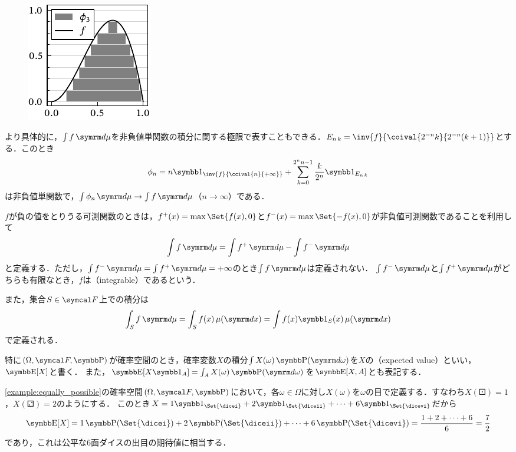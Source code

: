 \documentclass[../../main]{subfiles}
\begin{document}
\begin{figure}
  \includegraphics{figures/integration.pdf}
\end{figure}

より具体的に，\(\int f\measured{\mu}\)を非負値単関数の積分に関する極限で表すこともできる．\(\midx{E}{n}{k}=\inv{f}{\coival{2^{-n}k}{2^{-n}(k+1)}}\)とする．このとき
\[
  \phi_n = n\indicator_{\inv{f}{\ccival{n}{+\infty}}}+\sum_{k=0}^{2^nn-1}\frac{k}{2^n}\indicator_{\midx{E}{n}{k}}
\]
は非負値単関数で，\(\int\phi_n\measured{\mu}\to\int f\measured{\mu}\)（\(n\to\infty\)）である．

\(f\)が負の値をとりうる可測関数のときは，\(f^{\mathord{+}}(x)=\max\Set{f(x),0}\)と\(f^{\mathord{-}}(x)=\max\Set{-f(x),0}\)が非負値可測関数であることを利用して
\[
  \int f\measured{\mu} = \int f^{\mathord{+}}\measured{\mu}-\int f^{\mathord{-}}\measured{\mu}
\]
と定義する．ただし，\(\int f^{\mathord{-}}\measured{\mu}=\int f^{\mathord{+}}\measured{\mu}=+\infty\)のとき\(\int f\measured{\mu}\)は定義されない．
\(\int f^{\mathord{-}}\measured{\mu}\)と\(\int f^{\mathord{+}}\measured{\mu}\)がどちらも有限なとき，\(f\)は（integrable）であるという．

また，集合\(S\in\sigmaalg{F}\)上での積分は
\[
  \int_Sf\measured{\mu} = \int_Sf(x)\measured[x]{\mu}
  = \int f(x)\indicator_S(x)\measured[x]{\mu}
\]
で定義される．

特に\((\Omega,\sigmaalg{F},\prob)\)が確率空間のとき，確率変数\(X\)の積分\(\int X(\omega)\measured[\omega]{\prob}\)を\(X\)の（expected value）といい，\(\expval[X]\)と書く．
また，\(\expval[X\indicator_A]=\int_AX(\omega)\measured[\omega]{\prob}\)を\(\expval[X,A]\)とも表記する．

\begin{example}
  \cref{example:equally_possible}の確率空間\((\Omega,\sigmaalg{F},\prob)\)において，各\(\omega\in\Omega\)に対し\(X(\omega)\)を\(\omega\)の目で定義する．すなわち\(X(\dicei)=1\)，\(X(\diceii)=2\)のようにする．
  このとき\(X=1\indicator_{\Set{\dicei}}+2\indicator_{\Set{\diceii}}+\dots+6\indicator_{\Set{\dicevi}}\)だから
  \[
    \expval[X] = 1\prob({\Set{\dicei}})+2\prob(\Set{\diceii})+\dots+6\prob({\Set{\dicevi}})
    = \frac{1+2+\dots+6}{6}
    = \frac{7}{2}
  \]
  であり，これは公平な6面ダイスの出目の期待値に相当する．
\end{example}
\end{document}
